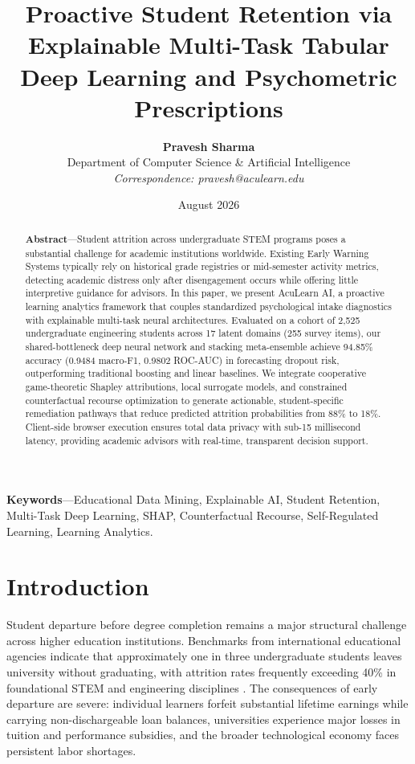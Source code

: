 \documentclass[twocolumn,10pt,a4paper]{article}
\title{\textbf{\LARGE Proactive Student Retention via Explainable Multi-Task Tabular Deep Learning and Psychometric Prescriptions}}
\author{
    \textbf{Pravesh Sharma}\\
    Department of Computer Science \& Artificial Intelligence\\
    \textit{Correspondence: pravesh@aculearn.edu}
}
\date{August 2026}
\begin{document}
\maketitle

\begin{abstract}
\noindent\textbf{Abstract}---Student attrition across undergraduate STEM programs poses a substantial challenge for academic institutions worldwide. Existing Early Warning Systems typically rely on historical grade registries or mid-semester activity metrics, detecting academic distress only after disengagement occurs while offering little interpretive guidance for advisors. In this paper, we present AcuLearn AI, a proactive learning analytics framework that couples standardized psychological intake diagnostics with explainable multi-task neural architectures. Evaluated on a cohort of 2,525 undergraduate engineering students across 17 latent domains (255 survey items), our shared-bottleneck deep neural network and stacking meta-ensemble achieve 94.85\% accuracy (0.9484 macro-F1, 0.9802 ROC-AUC) in forecasting dropout risk, outperforming traditional boosting and linear baselines. We integrate cooperative game-theoretic Shapley attributions, local surrogate models, and constrained counterfactual recourse optimization to generate actionable, student-specific remediation pathways that reduce predicted attrition probabilities from 88\% to 18\%. Client-side browser execution ensures total data privacy with sub-15 millisecond latency, providing academic advisors with real-time, transparent decision support.
\end{abstract}

\vspace{0.06cm}
\noindent\textbf{Keywords}---Educational Data Mining, Explainable AI, Student Retention, Multi-Task Deep Learning, SHAP, Counterfactual Recourse, Self-Regulated Learning, Learning Analytics.
\vspace{0.12cm}

\section{Introduction}
\label{sec:intro}
Student departure before degree completion remains a major structural challenge across higher education institutions. Benchmarks from international educational agencies indicate that approximately one in three undergraduate students leaves university without graduating, with attrition rates frequently exceeding 40\% in foundational STEM and engineering disciplines \cite{tinto1975dropout, tinto1993leaving, hassan2024predicting, alam2024generative}. The consequences of early departure are severe: individual learners forfeit substantial lifetime earnings while carrying non-dischargeable loan balances, universities experience major losses in tuition and performance subsidies, and the broader technological economy faces persistent labor shortages.
\end{document}
